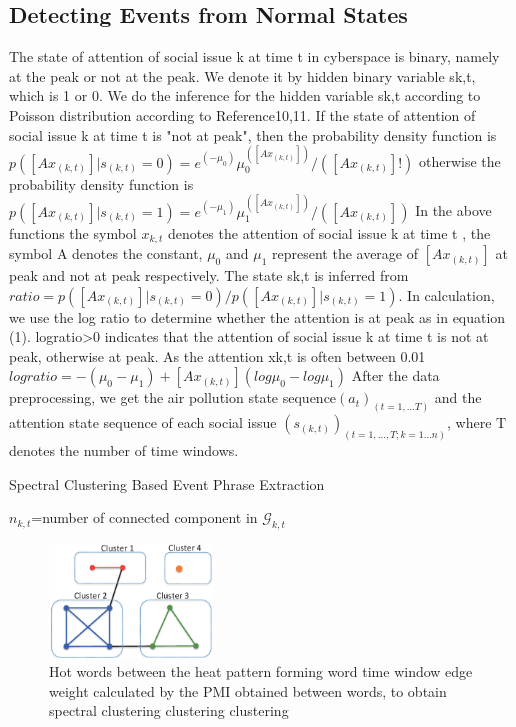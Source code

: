 \documentclass[conference,compsoc]{IEEEtran}
\begin{document}
\subsection{Detecting Events from Normal States}
The state of attention of social issue k at time t in cyberspace is binary, namely at the peak or not at the peak. We denote it by hidden binary variable sk,t, which is 1 or 0. We do the inference for the hidden variable sk,t according to Poisson distribution according to Reference10,11. If the state of attention of social issue k at time t is "not at peak", then the probability density function is 
\(p([Ax_(k,t) ]|s_(k,t)=0)=e^(-μ_0 )  μ_0^([Ax_(k,t)])/([Ax_(k,t)]!)\) otherwise the probability density function is \(p([Ax_(k,t) ]|s_(k,t)=1)=e^(-μ_1 )  μ_1^([Ax_(k,t)])/([Ax_(k,t)])\)
In the above functions the symbol \(x_{k,t}\) denotes the attention of social issue k at time t , the symbol A denotes the constant, \(μ_0\) and \(μ_1\) represent the average of \([Ax_(k,t)]\) at peak and not at peak respectively. The state sk,t is inferred from \(ratio=p([Ax_(k,t) ]|s_(k,t)=0)/p([Ax_(k,t) ]|s_(k,t)=1) \).
In calculation, we use the log ratio to determine whether the attention is at peak as in equation (1). logratio>0 indicates that the attention of social issue k at time t is not at peak, otherwise at peak. As the attention xk,t is often between 0.01%
	\(logratio=-(μ_0-μ_1 )+[Ax_(k,t)](log⁡μ_0 -log⁡μ_1)\)
After the data preprocessing, we get the air pollution state sequence\((a_t)_(t=1,…T)\) and the attention state sequence of each social issue \((s_(k,t))_(t=1,…,T;k=1…n)\), where T denotes the number of time windows.

\begin{algorithm}
\caption{Spectral Clustering Based Event Phrase Extraction}
\label{alg:eventKeywordsSearchMethod}
\(n_{k,t}\)=number of connected component in \(\mathcal{G}_{k,t}\)\\
\end{algorithm}


\begin{figure}
\centering
\includegraphics[height=3cm]{img/wordClusterGraph.eps}
\caption{Hot words between the heat pattern forming word time window edge weight calculated by the PMI obtained between words, to obtain spectral clustering clustering clustering}
\label{fig: windowsBurstyWordGraph}
\end{figure}
\end{document}
